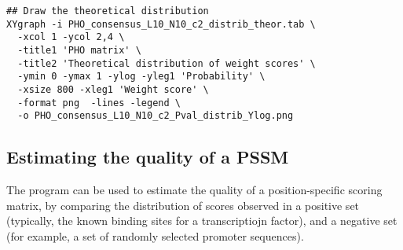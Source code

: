 {\color{Blue} \begin{footnotesize} 
\begin{verbatim}
## Draw the theoretical distribution
XYgraph -i PHO_consensus_L10_N10_c2_distrib_theor.tab \
  -xcol 1 -ycol 2,4 \
  -title1 'PHO matrix' \
  -title2 'Theoretical distribution of weight scores' \
  -ymin 0 -ymax 1 -ylog -yleg1 'Probability' \
  -xsize 800 -xleg1 'Weight score' \
  -format png  -lines -legend \
  -o PHO_consensus_L10_N10_c2_Pval_distrib_Ylog.png
\end{verbatim} \end{footnotesize}
}


\subsection{Estimating the quality of a PSSM}

The program \program{matrix-quality} can be used to estimate the
quality of a position-specific scoring matrix, by comparing the
distribution of scores observed in a positive set (typically, the
known binding sites for a transcriptiojn factor), and a negative set
(for example, a set of randomly selected promoter sequences).

